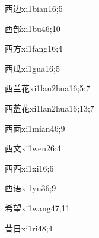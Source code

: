 \begin{verbete}{西边}{xi1bian1}{6;5}
\end{verbete}

\begin{verbete}{西部}{xi1bu4}{6;10}
\end{verbete}

\begin{verbete}{西方}{xi1fang1}{6;4}
\end{verbete}

\begin{verbete}{西瓜}{xi1gua1}{6;5}
\end{verbete}

\begin{verbete}{西兰花}{xi1lan2hua1}{6;5;7}
\end{verbete}

\begin{verbete}{西蓝花}{xi1lan2hua1}{6;13;7}
\end{verbete}

\begin{verbete}{西面}{xi1mian4}{6;9}
\end{verbete}

\begin{verbete}{西文}{xi1wen2}{6;4}
\end{verbete}

\begin{verbete}{西西}{xi1xi1}{6;6}
\end{verbete}

\begin{verbete}{西语}{xi1yu3}{6;9}
\end{verbete}

\begin{verbete}{希望}{xi1wang4}{7;11}
\end{verbete}

\begin{verbete}{昔日}{xi1ri4}{8;4}
\end{verbete}

